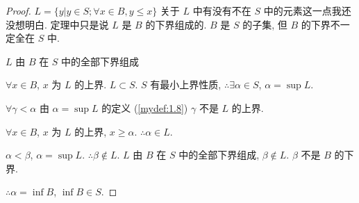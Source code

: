 \begin{proof}
    $L = \{y| y\in S; \forall x\in B, y\leq x\}$
    关于 $L$ 中有没有不在 $S$ 中的元素这一点我还没想明白.
    定理中只是说 $L$ 是 $B$ 的下界组成的. 
    $B$ 是 $S$ 的子集, 但 $B$ 的下界不一定全在 $S$ 中. 

    $L$ 由 $B$ 在 $S$ 中的全部下界组成

    $\forall x\in B$, $x$ 为 $L$ 的上界. $L\subset S$.
    $S$ 有最小上界性质,
    $\therefore \exists \alpha\in S$, $\alpha = \sup L$.

    $\forall \gamma <\alpha$ 由 $\alpha = \sup L$ 的定义 (\ref{mydef:1.8})
    $\gamma$ 不是 $L$ 的上界.

    $\forall x \in B$, $x$ 为 $L$ 的上界, $x \geq \alpha$. $\therefore \alpha \in L$.

    $\alpha < \beta$, $\alpha = \sup L$. $\therefore \beta \not\in L$.
    $L$ 由 $B$ 在 $S$ 中的全部下界组成, $\beta \not\in L$.
    $\beta$ 不是 $B$ 的下界.

    $\therefore \alpha = \inf B$, $\inf B\in S$.
\end{proof}


